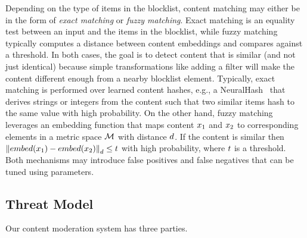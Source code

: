 %
Depending on the type of items in the blocklist, content matching may either be in the form of \emph{exact matching} or \emph{fuzzy matching}. Exact matching is an 
equality test between an input and the items in the blocklist, while fuzzy matching typically computes a 
distance between content embeddings and compares against a threshold. In both cases, the goal is to 
detect content that is similar (and not just identical) because simple transformations like adding a filter 
will make the content different enough from a nearby blocklist element. Typically, exact matching is performed over learned content hashes, e.g., a NeuralHash~\cite{apple2021csam} that derives strings or integers from the content such that two similar items hash to the same value with high probability. On the 
other hand, fuzzy matching leverages an embedding function  that maps content $\genericSetElmt[1]$ and 
$\genericSetElmt[2]$ to corresponding elements in a metric space 
$\metricSpace$ with distance $\distance$. If the content is similar then 
$\distanceNotation[\distance][\contentHash(\genericSetElmt[1])][\contentHash(\genericSetElmt[2])] 
\le \threshold$ with high 
probability, where $t$ is a threshold. Both mechanisms may introduce false positives and false negatives that can be tuned using parameters. 
 

\subsection{Threat Model}
%
Our content moderation system has three parties.

